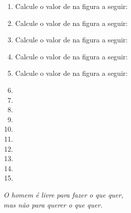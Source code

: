 \documentclass[twocolumn,oneside,a4paper,12pt]{article}
\begin{document}
\pagestyle{empty}
\begin{enumerate}
\item Calcule o valor de  na figura a seguir:

\item Calcule o valor de  na figura a seguir:

\item Calcule o valor de  na figura a seguir:

\item Calcule o valor de  na figura a seguir:

\item Calcule o valor de  na figura a seguir:

\item 
{}


\item 
{}


\item 
{}


\item 
{}


\item 
{}


\item 
{}


\item 
{}

\item
{}


\item
{}


\item
{}


\end{enumerate}

\begin{flushright}
\textit{O homem é livre para fazer o que quer,\\mas não para querer o que quer.}
\end{flushright}
\end{document}
